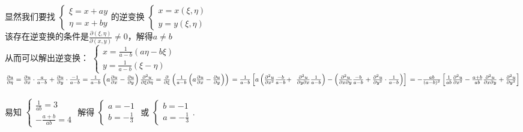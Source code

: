 \documentclass[a4paper,11pt,UTF8]{article}
\begin{document}
 显然我们要找
 $\left\{\begin{array}{l}
 	\xi=x+a y\\
    \eta=x+b y
 \end{array}\right.$的逆变换
$\left\{\begin{array}{l}
	x=x(\xi,\eta)\\
	y=y(\xi,\eta)
 \end{array}\right.$\\
该存在逆变换的条件是$\frac{\partial(\xi,\eta)}{\partial(x,y)}\neq0$，解得$a\neq b$\\
从而可以解出逆变换：
 $\left\{\begin{array}{l}
	x=\frac{1}{a-b}(a \eta-b \xi)\\
    y=\frac{1}{a-b}(\xi-\eta)
\end{array}\right.$\\
 $
 \frac{\partial u}{\partial \eta}=  \frac{\partial u}{\partial x} \cdot \frac{a}{a-b}+\frac{\partial u}{\partial y} \cdot \frac{-1}{a-b}=\frac{1}{a-b}\left(a \frac{\partial u}{\partial x}-\frac{\partial u}{\partial y}\right) \\
 \frac{\partial^2 u}{\partial \xi \partial \eta}=  \frac{\partial}{\partial \xi}\left(\frac{1}{a-b}\left(a \frac{\partial u}{\partial x}-\frac{\partial u}{\partial y}\right)\right)\\
 =\frac{1}{a-b}\left[a \left(\frac{\partial^2 u}{\partial x^2} \frac{-b}{a-b}+\right.\right. \left.\left.\frac{\partial^2 u}{\partial y \partial x} \frac{1}{a-b}\right)-\left(\frac{\partial^2 u}{\partial x \partial y} \frac{-b}{a-b}+\frac{\partial^2 u}{\partial y^2} \cdot \frac{1}{a-b}\right)\right] \\
 = -\frac{a b}{(a-b)^2}\left[\frac{1}{a b}\frac{\partial^2 u}{\partial x^2}-\frac{a+b}{a b} \frac{\partial^2 u}{\partial x \partial y}+ \frac{\partial^2 u}{\partial y^2}\right]
 $\\\\
 易知
  $\left\{\begin{array}{l}
 	\frac{1}{a b}=3\\
 	-\frac{a+b}{a b}=4
 \end{array}\right.$
解得 $\left\{\begin{array}{l}
	a=-1\\
	b=-\frac{1}{3}
\end{array}\right.$
 或 
$\left\{\begin{array}{l}
    b=-1\\
    a=-\frac{1}{3}
\end{array}\right.$.\\\\
\end{document}
